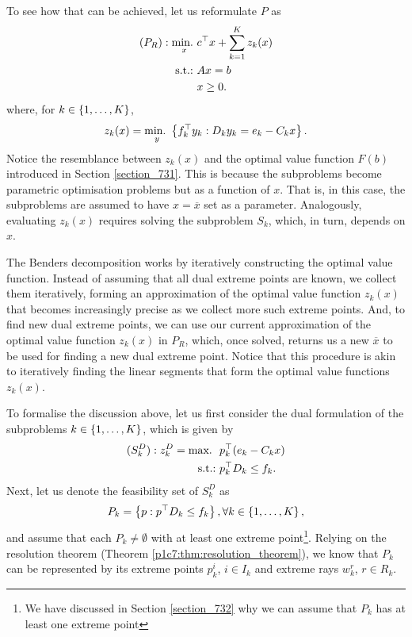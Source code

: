 To see how that can be achieved, let us reformulate $P$ as 
%
\begin{align*}
	(P_R) : \mathop{\text{min.~}}_x & c^\top x + \sum_{k=1}^K z_k(x) \\
	\mathop{\text{s.t.:~}}   & Ax = b \\
	      & x \geq 0.
\end{align*}
%
where, for $k \in \left\{ 1,\dots, K \right \}$,  
%
\begin{equation*}
	z_k(x) = \mathop{\text{min.~}}_y \left\{ f_k^\top y_k : D_ky_k = e_k - C_k x \right \}.	
\end{equation*}
%
Notice the resemblance between $z_k(x)$ and the optimal value function $F(b)$ introduced in Section \ref{section_731}. This is because the subproblems become parametric optimisation problems but as a function of $x$. That is, in this case, the subproblems are assumed to have $x = \overline{x}$ set as a parameter. Analogously, evaluating $z_k(x)$ requires solving the subproblem $S_k$, which, in turn, depends on $x$. 

The Benders decomposition works by iteratively constructing the optimal value function. Instead of assuming that all dual extreme points are known, we collect them iteratively, forming an approximation of the optimal value function $z_k(x)$ that becomes increasingly precise as we collect more such extreme points. And, to find new dual extreme points, we can use our current approximation of the optimal value function $z_k(x)$ in $P_R$, which, once solved, returns us a new $\overline{x}$ to be used for finding a new dual extreme point. Notice that this procedure is akin to iteratively finding the linear segments that form the optimal value functions $z_k(x)$.

To formalise the discussion above, let us first consider the dual formulation of the subproblems $k \in \left\{ 1,\dots, K \right \}$, which is given by
%
\begin{align*}
	(S^D_k): z^D_k = \mathop{\text{max.~}} \ & p_k^\top (e_k - C_k x) \\
	\mathop{\text{s.t.:~}}   & p_k^\top D_k \leq f_k.	 
\end{align*}
%
Next, let us denote the feasibility set of $S^D_k$ as 
%
\begin{equation}
	P_k =\left\{ p : p^\top D_k \leq f_k \right \}, \forall k \in \left\{ 1,\dots,K \right \}, 
\end{equation}
%
and assume that each $P_k \neq \emptyset$ with at least one extreme point\footnote{We have discussed in Section \ref{section_732} why we can assume that $P_k$ has at least one extreme point}. Relying on the resolution theorem (Theorem \ref{p1c7:thm:resolution_theorem}), we know that $P_k$ can be represented by its extreme points $p_k^i$, $i \in I_k$ and extreme rays $w^r_k$, $r \in R_k$.

